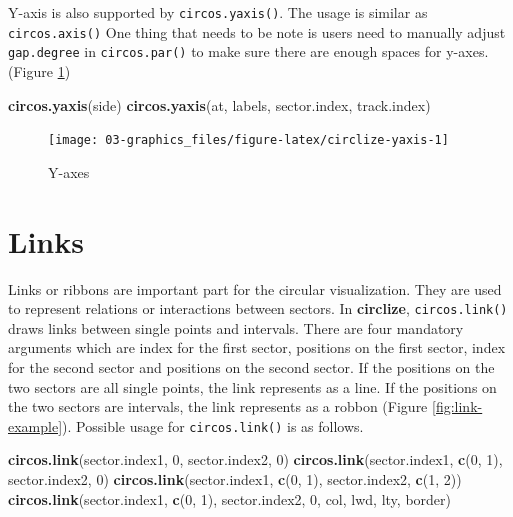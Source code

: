 \documentclass[]{book}
\newenvironment{Shaded}{\begin{snugshade}}{\end{snugshade}}
\newcommand{\KeywordTok}[1]{\textcolor[rgb]{0.13,0.29,0.53}{\textbf{#1}}}
\newcommand{\DecValTok}[1]{\textcolor[rgb]{0.00,0.00,0.81}{#1}}
\newcommand{\NormalTok}[1]{#1}
\theoremstyle{definition}
\theoremstyle{definition}
\theoremstyle{remark}
\begin{document}
Y-axis is also supported by \texttt{circos.yaxis()}. The usage is
similar as \texttt{circos.axis()} One thing that needs to be note is
users need to manually adjust \texttt{gap.degree} in
\texttt{circos.par()} to make sure there are enough spaces for y-axes.
(Figure \ref{fig:circlize-yaxis})

\begin{Shaded}
\begin{Highlighting}[]
\KeywordTok{circos.yaxis}\NormalTok{(side)}
\KeywordTok{circos.yaxis}\NormalTok{(at, labels, sector.index, track.index)}
\end{Highlighting}
\end{Shaded}

\begin{figure}

{\centering \texttt{[image: 03-graphics\_files/figure-latex/circlize-yaxis-1]} 

}

\caption{Y-axes}\label{fig:circlize-yaxis}
\end{figure}

\section{Links}\label{links}

Links or ribbons are important part for the circular visualization. They
are used to represent relations or interactions between sectors. In
\textbf{circlize}, \texttt{circos.link()} draws links between single
points and intervals. There are four mandatory arguments which are index
for the first sector, positions on the first sector, index for the
second sector and positions on the second sector. If the positions on
the two sectors are all single points, the link represents as a line. If
the positions on the two sectors are intervals, the link represents as a
robbon (Figure \ref{fig:link-example}). Possible usage for
\texttt{circos.link()} is as follows.

\begin{Shaded}
\begin{Highlighting}[]
\KeywordTok{circos.link}\NormalTok{(sector.index1, }\DecValTok{0}\NormalTok{, sector.index2, }\DecValTok{0}\NormalTok{)}
\KeywordTok{circos.link}\NormalTok{(sector.index1, }\KeywordTok{c}\NormalTok{(}\DecValTok{0}\NormalTok{, }\DecValTok{1}\NormalTok{), sector.index2, }\DecValTok{0}\NormalTok{)}
\KeywordTok{circos.link}\NormalTok{(sector.index1, }\KeywordTok{c}\NormalTok{(}\DecValTok{0}\NormalTok{, }\DecValTok{1}\NormalTok{), sector.index2, }\KeywordTok{c}\NormalTok{(}\DecValTok{1}\NormalTok{, }\DecValTok{2}\NormalTok{))}
\KeywordTok{circos.link}\NormalTok{(sector.index1, }\KeywordTok{c}\NormalTok{(}\DecValTok{0}\NormalTok{, }\DecValTok{1}\NormalTok{), sector.index2, }\DecValTok{0}\NormalTok{, col, lwd, lty, border)}
\end{Highlighting}
\end{Shaded}
\end{document}
